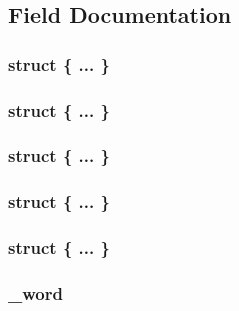 \subsection{Field Documentation}
\hypertarget{union___p_o_i_n_t_e_r_a2cdd95bb2f5740a308e66820ed6a663a}{}\subsubsection[{"@335}]{\setlength{\rightskip}{0pt plus 5cm}struct \{ ... \} }\label{union___p_o_i_n_t_e_r_a2cdd95bb2f5740a308e66820ed6a663a}
\hypertarget{union___p_o_i_n_t_e_r_a587d14d1308a875a0a5e4070fa02ec4c}{}\subsubsection[{"@349}]{\setlength{\rightskip}{0pt plus 5cm}struct \{ ... \} }\label{union___p_o_i_n_t_e_r_a587d14d1308a875a0a5e4070fa02ec4c}
\hypertarget{union___p_o_i_n_t_e_r_aac670b88712961acc2c705c3b1f98983}{}\subsubsection[{"@365}]{\setlength{\rightskip}{0pt plus 5cm}struct \{ ... \} }\label{union___p_o_i_n_t_e_r_aac670b88712961acc2c705c3b1f98983}
\hypertarget{union___p_o_i_n_t_e_r_a1f40ea787094cb439c95eddff0b8c772}{}\subsubsection[{"@383}]{\setlength{\rightskip}{0pt plus 5cm}struct \{ ... \} }\label{union___p_o_i_n_t_e_r_a1f40ea787094cb439c95eddff0b8c772}
\hypertarget{union___p_o_i_n_t_e_r_a5164894f9d975152817be6059138112c}{}\subsubsection[{"@385}]{\setlength{\rightskip}{0pt plus 5cm}struct \{ ... \} }\label{union___p_o_i_n_t_e_r_a5164894f9d975152817be6059138112c}
\hypertarget{union___p_o_i_n_t_e_r_a6a5f159fcaca96aba991cf7298cc1083}{}
\subsubsection[{\+\_\+word}]{ \+\_\+word}\label{union___p_o_i_n_t_e_r_a6a5f159fcaca96aba991cf7298cc1083}


